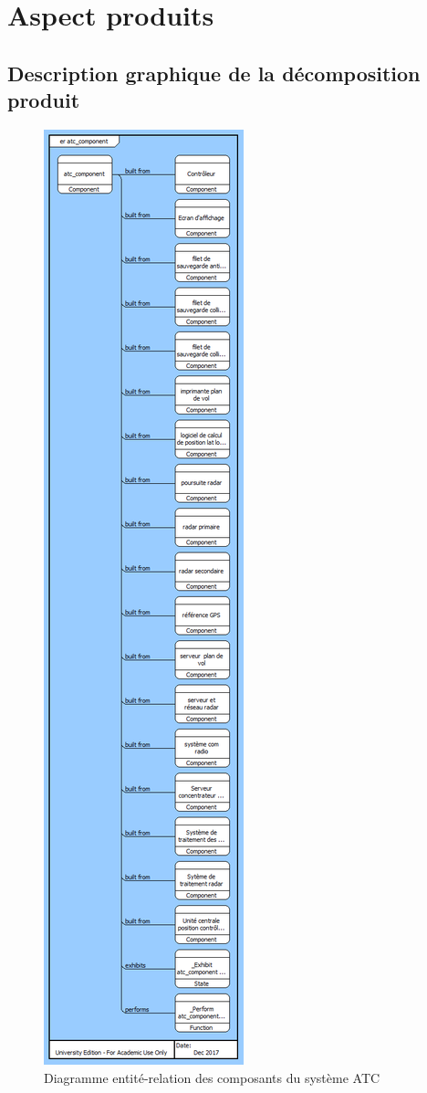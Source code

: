 
\section{Aspect produits }

\subsection{ Description graphique de la décomposition produit }
	\begin{figure}[H]
	\begin{center}	
		\includegraphics[scale=0.45]{images/atc_component}
		\caption{Diagramme entité-relation des composants du système ATC}
		\label{prod}
	\end{center}
\end{figure}




